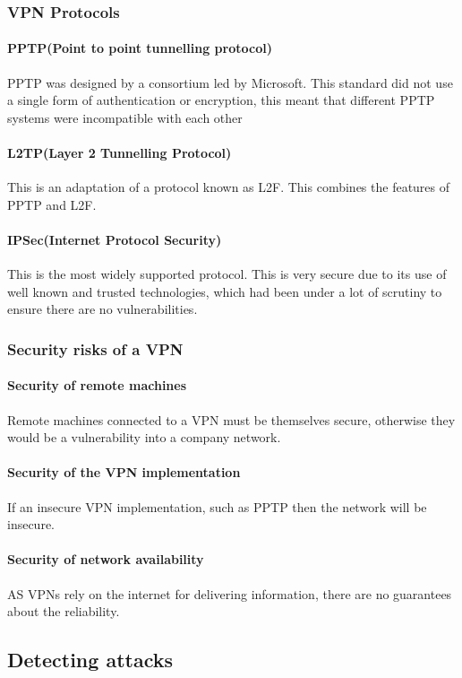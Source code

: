 \documentclass{article}[18pt]
\begin{document}
\subsubsection{VPN Protocols}
\paragraph{PPTP(Point to point tunnelling protocol)}
PPTP was designed by a consortium led by Microsoft. This standard did not use a single form of authentication or encryption, this meant that different PPTP systems were incompatible with each other
\paragraph{L2TP(Layer 2 Tunnelling Protocol)}
This is an adaptation of a protocol known as L2F. This combines the features of PPTP and L2F.
\paragraph{IPSec(Internet Protocol Security)}
This is the most widely supported protocol. This is very secure due to its use of well known and trusted technologies, which had been under a lot of scrutiny to ensure there are no vulnerabilities.
\subsubsection{Security risks of a VPN}
\paragraph{Security of remote machines}
Remote machines connected to a VPN must be themselves secure, otherwise they would be a vulnerability into a company network.
\paragraph{Security of the VPN implementation}
If an insecure VPN implementation, such as PPTP then the network will be insecure.
\paragraph{Security of network availability}
AS VPNs rely on the internet for delivering information, there are no guarantees about the reliability.
\subsection{Detecting attacks}
\end{document}

